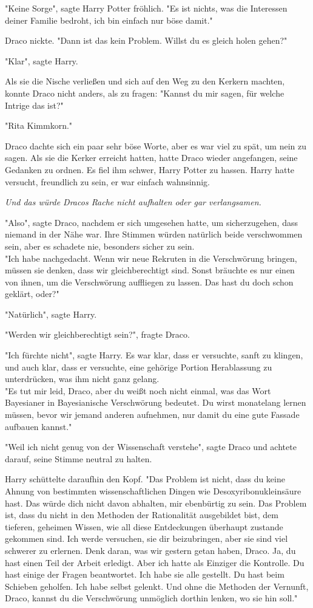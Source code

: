 {"Keine Sorge", sagte Harry Potter fröhlich. "Es ist nichts, was die Interessen deiner Familie bedroht, ich bin einfach nur böse damit."

Draco nickte. "Dann ist das kein Problem. Willst du es gleich holen gehen?"

"Klar", sagte Harry.

Als sie die Nische verließen und sich auf den Weg zu den Kerkern machten, konnte Draco nicht anders, als zu fragen: "Kannst du mir sagen, für welche Intrige das ist?"

"Rita Kimmkorn."

Draco dachte sich ein paar sehr böse Worte, aber es war viel zu spät, um nein zu sagen. Als sie die Kerker erreicht hatten, hatte Draco wieder angefangen, seine Gedanken zu ordnen. Es fiel ihm schwer, Harry Potter zu hassen. Harry hatte versucht, freundlich zu sein, er war einfach wahnsinnig.

\emph{Und das würde Dracos Rache nicht aufhalten oder gar verlangsamen.}

"Also", sagte Draco, nachdem er sich umgesehen hatte, um sicherzugehen, dass niemand in der Nähe war. Ihre Stimmen würden natürlich beide verschwommen sein, aber es schadete nie, besonders sicher zu sein.\\ "Ich habe nachgedacht. Wenn wir neue Rekruten in die Verschwörung bringen, müssen sie denken, dass wir gleichberechtigt sind. Sonst bräuchte es nur einen von ihnen, um die Verschwörung auffliegen zu lassen. Das hast du doch schon geklärt, oder?"

"Natürlich", sagte Harry.

"Werden wir gleichberechtigt sein?", fragte Draco.

"Ich fürchte nicht", sagte Harry. Es war klar, dass er versuchte, sanft zu klingen, und auch klar, dass er versuchte, eine gehörige Portion Herablassung zu unterdrücken, was ihm nicht ganz gelang.\\ "Es tut mir leid, Draco, aber du weißt noch nicht einmal, was das Wort Bayesianer in Bayesianische Verschwörung bedeutet. Du wirst monatelang lernen müssen, bevor wir jemand anderen aufnehmen, nur damit du eine gute Fassade aufbauen kannst."

"Weil ich nicht genug von der Wissenschaft verstehe", sagte Draco und achtete darauf, seine Stimme neutral zu halten.

Harry schüttelte daraufhin den Kopf. "Das Problem ist nicht, dass du keine Ahnung von bestimmten wissenschaftlichen Dingen wie Desoxyribonukleinsäure hast. Das würde dich nicht davon abhalten, mir ebenbürtig zu sein. Das Problem ist, dass du nicht in den Methoden der Rationalität ausgebildet bist, dem tieferen, geheimen Wissen, wie all diese Entdeckungen überhaupt zustande gekommen sind. Ich werde versuchen, sie dir beizubringen, aber sie sind viel schwerer zu erlernen. Denk daran, was wir gestern getan haben, Draco. Ja, du hast einen Teil der Arbeit erledigt. Aber ich hatte als Einziger die Kontrolle. Du hast einige der Fragen beantwortet. Ich habe sie alle gestellt. Du hast beim Schieben geholfen. Ich habe selbst gelenkt. Und ohne die Methoden der Vernunft, Draco, kannst du die Verschwörung unmöglich dorthin lenken, wo sie hin soll."

}
